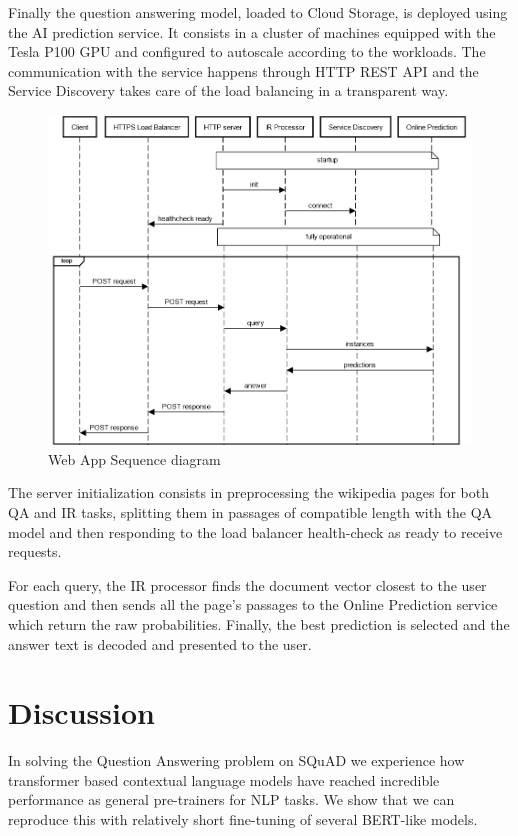 \documentclass{article}
\begin{document}
Finally the question answering model, loaded to Cloud Storage, is deployed using the AI prediction service.
It consists in a cluster of machines equipped with the Tesla P100 GPU and configured to autoscale according to the workloads. 
The communication with the service happens through HTTP REST API and the Service Discovery takes care of the load balancing in a transparent way.

\begin{figure}[h]
\includegraphics[width=\textwidth]{sequence.png}
\caption{Web App Sequence diagram} \label{seq_diag}
\end{figure}

The server initialization consists in preprocessing the wikipedia pages for both QA and IR tasks, splitting them in passages of compatible length with the QA model and then responding to the load balancer health-check as ready to receive requests.

For each query, the IR processor finds the document vector closest to the user question and then sends all the page’s passages to the Online Prediction service which return the raw probabilities.
Finally, the best prediction is selected and the answer text is decoded and presented to the user.


\pagebreak
\section{Discussion} 

In solving the Question Answering problem on SQuAD we experience how transformer based contextual language models have reached incredible performance as general pre-trainers for NLP tasks.
We show that we can reproduce this with relatively short fine-tuning of several BERT-like models.
\end{document}
